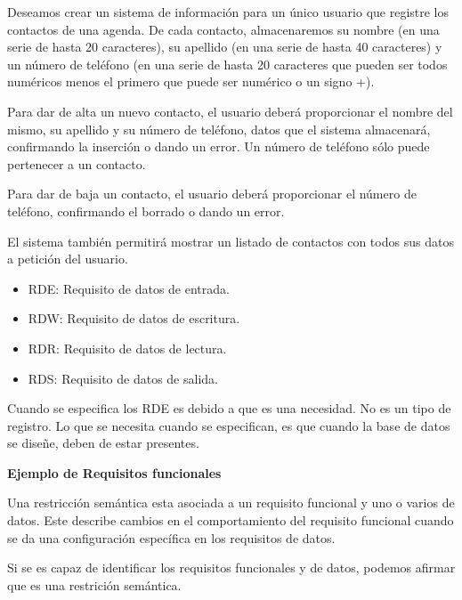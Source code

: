 \documentclass[12pt]{report} %
\providecommand{\tightlist}{%
  \setlength{\itemsep}{0pt}\setlength{\parskip}{0pt}}
\begin{document}
\begin{ejemplo}
Deseamos crear un sistema de información para un único usuario que registre los contactos de una agenda. De cada contacto, almacenaremos su nombre (en una serie de hasta 20 caracteres), su apellido (en una serie de hasta 40 caracteres) y un número de teléfono (en una serie de hasta 20 caracteres que pueden ser todos numéricos menos el primero que puede ser numérico o un signo +). 

Para dar de alta un nuevo contacto, el usuario deberá proporcionar el nombre del mismo, su apellido y su número de teléfono, datos que el sistema almacenará, confirmando la inserción o dando un error. Un número de teléfono sólo puede pertenecer a un contacto. 

Para dar de baja un contacto, el usuario deberá proporcionar el número de teléfono, confirmando el borrado o dando un error. 

El sistema también permitirá mostrar un listado de contactos con todos sus datos a petición del usuario.
\end{ejemplo}

\begin{itemize}
\tightlist
\item
  RDE: Requisito de datos de entrada.
\item
  RDW: Requisito de datos de escritura.
\item
  RDR: Requisito de datos de lectura.
\item
  RDS: Requisito de datos de salida.
\end{itemize}

Cuando se especifica los RDE es debido a que es una necesidad. No es un
tipo de registro. Lo que se necesita cuando se especifican, es que
cuando la base de datos se diseñe, deben de estar presentes.

\textbf{Ejemplo de Requisitos funcionales}


Una restricción semántica esta asociada a un requisito funcional y uno o
varios de datos. Este describe cambios en el comportamiento del
requisito funcional cuando se da una configuración específica en los
requisitos de datos.

Si se es capaz de identificar los requisitos funcionales y de datos,
podemos afirmar que es una restrición semántica.


\end{document}
